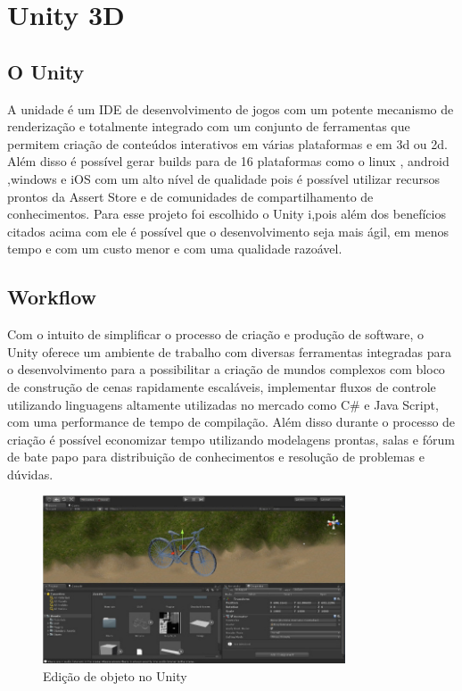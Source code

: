 \section{Unity 3D} %
\label{sec:unity_3d}

\subsection{O Unity }
\label{sub:o_unity}
	A unidade é um IDE de desenvolvimento de jogos com um potente mecanismo de renderização e totalmente integrado com um conjunto de ferramentas que permitem criação de conteúdos interativos em várias plataformas e em  3d ou 2d. Além disso é possível gerar builds para de 16 plataformas  como o linux , android ,windows e iOS com um alto nível de qualidade pois é possível utilizar recursos prontos da Assert Store e de comunidades de compartilhamento de conhecimentos. 
	Para esse projeto foi escolhido o Unity i,pois  além dos benefícios citados acima com ele é possível que o desenvolvimento seja mais ágil, em menos tempo e com um custo menor e com uma qualidade razoável. 

\subsection{Workflow} %
\label{sub:workflow}
	Com o intuito de simplificar o processo de criação e produção de software, o Unity oferece um ambiente de trabalho com diversas ferramentas integradas para o desenvolvimento para a possibilitar a criação de mundos complexos com bloco de construção de cenas rapidamente escaláveis, implementar fluxos de controle utilizando linguagens altamente utilizadas no mercado como C\# e Java Script, com uma performance de tempo de compilação. Além disso durante o processo de criação é possível economizar tempo utilizando modelagens prontas, salas e fórum de bate papo para distribuição de conhecimentos e resolução de problemas e dúvidas.

\begin{figure}[h]
  \centering
  \includegraphics[width=0.8\textwidth]
      {figuras/bike.png}
  \caption{Edição de objeto no Unity}
  \label{coordenadas-rift}
\end{figure}

